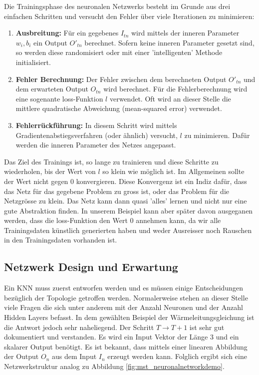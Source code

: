 Die Trainingsphase des neuronalen Netzwerks besteht im Grunde aus drei einfachen Schritten und versucht den Fehler über viele Iterationen zu minimieren:
\begin{enumerate}
	\item {\textbf{Ausbreitung:} Für ein gegebenes $I_{tn}$ wird mittels der inneren Parameter $w_{i}, b_{i}$ ein Output $O'_{tn}$ berechnet. Sofern keine inneren Parameter gesetzt sind, so werden diese randomisiert oder mit einer 'intelligenten' Methode initialisiert.}
	\item {\textbf{Fehler Berechnung:} Der Fehler zwischen dem berechneten Output $O'_{tn}$ und dem erwarteten Output $O_{tn}$ wird berechnet. Für die Fehlerberechnung wird eine sogenante loss-Funktion $l$ verwendet. Oft wird an dieser Stelle die mittlere quadratische Abweichung (mean-squared error) verwendet.}
	\item{\textbf{ Fehlerrückführung:} In diesem Schritt wird mittels Gradientenabstiegsverfahren (oder ähnlich) versucht, $l$ zu minimieren. Dafür werden die inneren Parameter des Netzes angepasst.}
\end{enumerate}
Das Ziel des Trainings ist, so lange zu trainieren und diese Schritte zu wiederholen, bis der Wert von $l$ so klein wie möglich ist. 
Im Allgemeinen sollte der Wert nicht gegen 0 konvergieren. Diese Konvergenz ist ein Indiz dafür, dass das Netz für das gegebene Problem zu gross ist, oder das Problem für die Netzgrösse zu klein. Das Netz kann dann quasi 'alles' lernen und nicht nur eine gute Abstraktion finden.
In unserem Beispiel kann aber später davon ausgeganen werden, dass die loss-Funktion den Wert 0 annehmen kann, da wir alle Trainingsdaten künstlich generierten haben und weder Ausreisser noch Rauschen in den Trainingsdaten vorhanden ist.

\subsection{Netzwerk Design und Erwartung}
Ein KNN muss zuerst entworfen werden und es müssen einige Entscheidungen bezüglich der Topologie getroffen werden. Normalerweise stehen an dieser Stelle viele Fragen die sich unter anderem mit der Anzahl Neuronen und der Anzahl Hidden Layers befasst. In dem gewählten Beispiel der Wärmeleitungsgleichung ist die Antwort jedoch sehr naheliegend. Der Schritt $T \rightarrow T+1$ ist sehr gut dokumentiert und verstanden. Es wird ein Input Vektor der Länge 3 und ein skalarer Output benötigt. Es ist bekannt, dass mittels einer linearen Abbildung der Output $O_n$ aus dem Input $I_n$ erzeugt werden kann. Folglich ergibt sich eine Netzwerkstruktur analog zu Abbildung \ref{fig:mst_neuronalnetworkdemo}.

